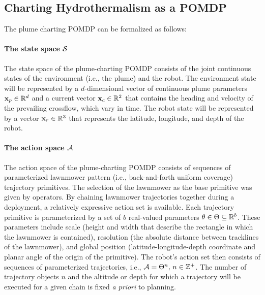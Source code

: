 \subsection{Charting Hydrothermalism as a POMDP}
\label{sec:pomdp}
The plume charting POMDP can be formalized as follows: 

\paragraph{The state space $\mathcal{S}$} The state space of the plume-charting POMDP consists of the joint continuous states of the environment (i.e., the plume) and the robot. The environment state will be represented by a $d$-dimensional vector of continuous plume parameters $\mathbf{x}_p \in \mathbb{R}^d$ and a current vector $\mathbf{x}_c \in \mathbb{R}^2$ that contains the heading and velocity of the prevailing crossflow, which vary in time. The robot state will be represented by a vector $\mathbf{x}_r \in \mathbb{R}^3$ that represents the latitude, longitude, and depth of the robot.

\paragraph{The action space $\mathcal{A}$} The action space of the plume-charting POMDP consists of sequences of parameterized lawnmower pattern (i.e., back-and-forth uniform coverage) trajectory primitives. The selection of the lawnmower as the base primitive was given by \Sentry operators. By chaining lawnmower trajectories together during a deployment, a relatively expressive action set is available. Each trajectory primitive is parameterized by a set of $b$ real-valued parameters $\theta \in \Theta \subseteq \mathbb{R}^b$. These parameters include scale (height and width that describe the rectangle in which the lawnmower is contained), resolution (the absolute distance between tracklines of the lawnmower), and global position (latitude-longitude-depth coordinate and planar angle of the origin of the primitive). The robot's action set then consists of sequences of parameterized trajectories, i.e., $\mathcal{A} = \Theta^n, \, n \in \mathbb{Z}^+$. The number of trajectory objects $n$ and the altitude or depth for which a trajectory will be executed for a given chain is fixed \emph{a priori} to planning. 

